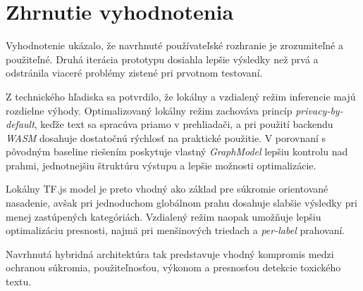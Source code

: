 \section{Zhrnutie vyhodnotenia}

Vyhodnotenie ukázalo, že navrhnuté používateľské rozhranie je zrozumiteľné a použiteľné. Druhá iterácia prototypu dosiahla lepšie výsledky než prvá a odstránila viaceré problémy zistené pri prvotnom testovaní.

Z technického hľadiska sa potvrdilo, že lokálny a vzdialený režim inferencie majú rozdielne výhody. Optimalizovaný lokálny režim zachováva princíp \emph{privacy-by-default}, keďže text sa spracúva priamo v prehliadači, a pri použití backendu \emph{WASM} dosahuje dostatočnú rýchlosť na praktické použitie. V porovnaní s pôvodným baseline riešením poskytuje vlastný \emph{GraphModel} lepšiu kontrolu nad prahmi, jednotnejšiu štruktúru výstupu a lepšie možnosti optimalizácie.

Lokálny TF.js model je preto vhodný ako základ pre súkromie orientované nasadenie, avšak pri jednoduchom globálnom prahu dosahuje slabšie výsledky pri menej zastúpených kategóriách. Vzdialený režim naopak umožňuje lepšiu optimalizáciu presnosti, najmä pri menšinových triedach a \emph{per-label} prahovaní.

Navrhnutá hybridná architektúra tak predstavuje vhodný kompromis medzi ochranou súkromia, použiteľnosťou, výkonom a presnosťou detekcie toxického textu.